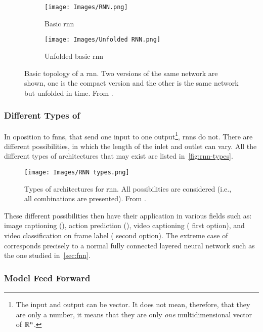\begin{figure}[ht]
  \begin{subfigure}[t]{.2\textwidth}
    \centering
    \caption{Basic \gls{rnn}}
    \texttt{[image: Images/RNN.png]}
  \end{subfigure}\hfill
  \begin{subfigure}[t]{.8\textwidth}
    \centering
    \caption{Unfolded basic \gls{rnn}}
    \texttt{[image: Images/Unfolded RNN.png]}
  \end{subfigure}
  \caption[Basic topology of a ]{Basic topology of a
    \acf{rnn}. Two versions of the same network are shown, one is the compact
    version and the other is the same network but unfolded in time. From
    .}%
  \label{fig:rnn}
\end{figure}

\subsubsection{Different Types of }

In oposition to \glspl{fnn}, that send one input to one output\footnote{The
  input and output can be vector. It does not mean, therefore, that they are
  only a number, it means that they are only \emph{one} multidimensional vector
  of \(\mathbb{R}^n\).}, \glspl{rnn} do not. There are different possibilities, in
which the length of the inlet and outlet can vary. All the different types of
architectures that may exist are listed in\ \vref{fig:rnn-types}.

\begin{figure}[ht]
  \centering
  \texttt{[image: Images/RNN types.png]}
  \caption[Types of architectures for ]{Types of
    architectures for \gls{rnn}. All possibilities are considered (i.e., all
    combinations are presented). From
    .}%
  \label{fig:rnn-types}
\end{figure}

These different possibilities then have their application in various fields
such as: image captioning (), action prediction (), video captioning ( first option), and video
classification on frame label ( second option). The extreme
case of  corresponds precisely to a normal fully connected
layered neural network such as the one studied in\ \vref{sec:fnn}.

\subsubsection{Model Feed Forward}


